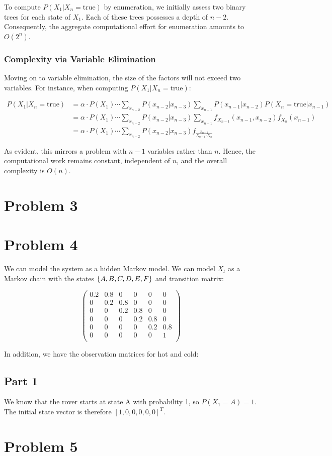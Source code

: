 \documentclass[12pt]{article}
\begin{document}
To compute 
$P(X_1 | X_n = \text{true})$ 
by enumeration, 
we initially assess two binary trees for each state of $X_1$. 
Each of these trees possesses a depth of $n - 2$. 
Consequently, 
the aggregate computational effort for enumeration amounts to $\boxed{O(2^n)}$.

\subsubsection{Complexity via Variable Elimination}

Moving on to variable elimination, 
the size of the factors will not exceed two variables. 
For instance, 
when computing $P(X_1 | X_n = \text{true})$:

\begin{align*}
P(X_1 | X_n = \text{true})
& = \alpha \cdot P(X_1) \cdots \sum_{x_{n-2}} P(x_{n-2} | x_{n-3}) \sum_{x_{n-1}} P(x_{n-1} | x_{n-2}) P(X_n = \text{true} | x_{n-1}) \\
& = \alpha \cdot P(X_1) \cdots \sum_{x_{n-2}} P(x_{n-2} | x_{n-3}) \sum_{x_{n-1}} f_{X_{n-1}}(x_{n-1}, x_{n-2}) f_{X_n}(x_{n-1}) \\
& = \alpha \cdot P(X_1) \cdots \sum_{x_{n-2}} P(x_{n-2} | x_{n-3}) f_{\frac{x_{n-2}}{X_{n-1} \cdot X_n}}
\end{align*}

As evident, 
this mirrors a problem with $n-1$ variables rather than $n$. 
Hence, 
the computational work remains constant, 
independent of $n$, 
and the overall complexity is $\boxed{O(n)}$.


\section{Problem 3}

\section{Problem 4}

We can model the system as a hidden Markov model.
We can model $X_t$ as a Markov chain with the states 
$\left \{ A, B, C, D, E, F \right \}$ 
and transition matrix:

$$
\begin{pmatrix}
0.2 & 0.8 & 0 & 0 & 0 & 0 \\
0 & 0.2 & 0.8 & 0 & 0 & 0 \\
0 & 0 & 0.2 & 0.8 & 0 & 0 \\
0 & 0 & 0 & 0.2 & 0.8 & 0 \\
0 & 0 & 0 & 0 & 0.2 & 0.8 \\
0 & 0 & 0 & 0 & 0 & 1 \\
\end{pmatrix}
$$

In addition,
we have the observation matrices for hot and cold:

\subsection{Part 1}

We know that the rover starts at state A with probability 1,
so $P(X_1 = A) = 1$.
The initial state vector is therefore $[1, 0, 0, 0, 0, 0]^T$.




\section{Problem 5}
\end{document}

